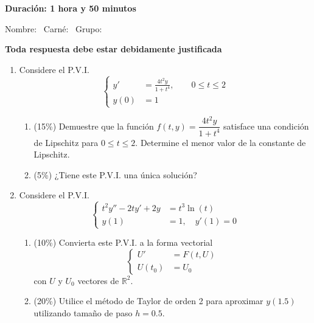 \documentclass[11pt]{article}
\begin{document}
\examheader

\vspace{4pt}
\noindent\textbf{Duración: 1 hora y 50 minutos}

\vspace{4pt}
\noindent Nombre: \dotfill\ Carné: \dotfill\ Grupo: \dotfill

\begin{center}\textbf{Toda respuesta debe estar debidamente justificada}\end{center}

\begin{enumerate}
\item{} Considere el P.V.I.
\[
\left\{
\begin{aligned}
y' &= \frac{4t^2y}{1+t^4}, \qquad 0\leq t\leq 2\\
y(0) &= 1
\end{aligned}
\right.
\]
\begin{enumerate}
\item{} (15\%) Demuestre que la función $f(t,y)=\dfrac{4t^2y}{1+t^4}$ satisface una condición de Lipschitz para $0\leq t\leq 2$. Determine el menor valor de la constante de Lipschitz.

\vspace{4cm}

\item{} (5\%) ¿Tiene este P.V.I. una única solución?

\vspace{2cm}
\end{enumerate}

\item{} Considere el P.V.I.
\[
\left\{
\begin{aligned}
t^2y''-2ty'+2y &= t^3\ln(t)\\
y(1)&=1,\quad y'(1)=0
\end{aligned}
\right.
\]
\begin{enumerate}
\item{} (10\%) Convierta este P.V.I. a la forma vectorial
\[
\left\{
\begin{aligned}
U' &= F(t,U)\\
U(t_0) &= U_0
\end{aligned}
\right.
\]
\noindent con $U$ y $U_0$ vectores de $\mathbb{R}^2$.

\vspace{4cm}

\item{} (20\%) Utilice el método de Taylor de orden 2 para aproximar $y(1.5)$ utilizando tamaño de paso $h=0.5$.


\end{enumerate}
\end{enumerate}
\end{document}
